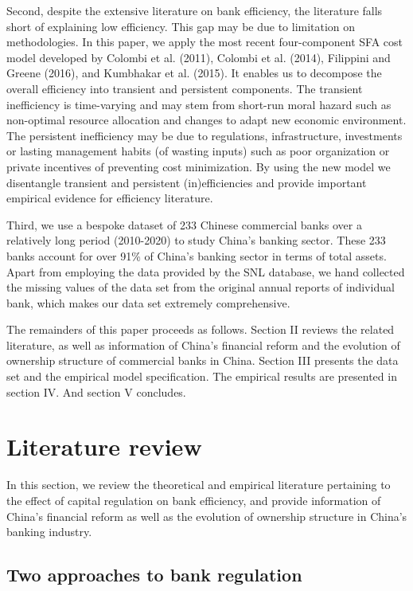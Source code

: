 \documentclass[
  12pt,
  a4paper,
]{scrreprt}
\begin{document}
{{{{Second, despite the extensive literature on bank efficiency, the
literature falls short of explaining low efficiency. This gap may be due
to limitation on methodologies. In this paper, we apply the most recent
four-component SFA cost model developed by Colombi et al. (2011),
Colombi et al. (2014), Filippini and Greene (2016), and Kumbhakar et al.
(2015). It enables us to decompose the overall efficiency into transient
and persistent components. The transient inefficiency is time-varying
and may stem from short-run moral hazard such as non-optimal resource
allocation and changes to adapt new economic environment. The persistent
inefficiency may be due to regulations, infrastructure, investments or
lasting management habits (of wasting inputs) such as poor organization
or private incentives of preventing cost minimization. By using the new
model we disentangle transient and persistent (in)efficiencies and
provide important empirical evidence for efficiency literature.

Third, we use a bespoke dataset of 233 Chinese commercial banks over a
relatively long period (2010-2020) to study China's banking sector.
These 233 banks account for over 91\% of China's banking sector in terms
of total assets. Apart from employing the data provided by the SNL
database, we hand collected the missing values of the data set from the
original annual reports of individual bank, which makes our data set
extremely comprehensive.

The remainders of this paper proceeds as follows. Section II reviews the
related literature, as well as information of China's financial reform
and the evolution of ownership structure of commercial banks in China.
Section III presents the data set and the empirical model specification.
The empirical results are presented in section IV. And section V
concludes.

\section{Literature review}\label{literature-review}

In this section, we review the theoretical and empirical literature
pertaining to the effect of capital regulation on bank efficiency, and
provide information of China's financial reform as well as the evolution
of ownership structure in China's banking industry.

\subsection{Two approaches to bank
regulation}\label{two-approaches-to-bank-regulation}

}}}}
\end{document}
